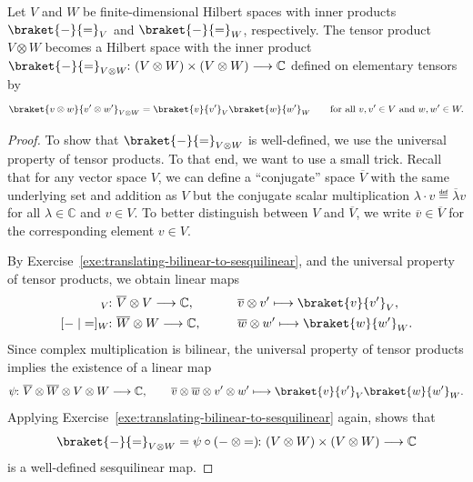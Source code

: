 \documentclass[a4paper, oneside, 12pt]{amsart}
\begin{document}
\begin{proposition}\label{prop:unitary-on-tensor-product}
  Let \( V \) and \( W \) be finite-dimensional Hilbert spaces with inner products \( \braket{\blank}{\bblank}_V \) and \( \braket{\blank}{\bblank}_W \), respectively.
  The tensor product \( V \otimes W \) becomes a Hilbert space with the inner product \(\braket{\blank}{\bblank}_{V \otimes W} \from (V \otimes W) \times (V \otimes W) \to \mathbb{C}\) defined on elementary tensors by
  \begin{equation}
    \braket{v \otimes w}{v' \otimes w'}_{V \otimes W} = \braket{v}{v'}_V \braket{w}{w'}_W \qquad \text{for all } v, v' \in V \text{ and }w, w' \in W.
  \end{equation}
\end{proposition}
\begin{proof}
  To show that \( \braket{\blank}{\bblank}_{V \otimes W} \) is well-defined, we use the universal property of tensor products.
  To that end, we want to use a small trick.
  Recall that for any vector space \(V\), we can define a ``conjugate'' space \(\overline{V}\) with the same underlying set and addition as \(V\) but the conjugate scalar multiplication \(\lambda \cdot v \eqdef \overline{\lambda}v\) for all \(\lambda \in \mathbb{C}\)  and \(v \in V\).
  To better distinguish between \(V\) and \(\overline{V}\), we write \(\overline{v} \in \overline{V}\) for the corresponding element \(v\in V\).

  By Exercise~\ref{exe:translating-bilinear-to-sesquilinear},
  and the universal property of tensor products, we obtain linear maps
  \begin{align*}
    [ \blank \mid \bblank]_{V} &\from \overline{V}\otimes V \to \mathbb{C}, \qquad &&\overline{v} \otimes v' \mapsto \braket{v}{v'}_{V},\\
    [ \blank \mid \bblank]_{W} &\from \overline{W}\otimes W \to \mathbb{C}, \qquad &&\overline{w} \otimes w' \mapsto \braket{w}{w'}_{W}.
  \end{align*}
  Since complex multiplication is bilinear, the universal property of tensor products implies the existence of a linear map
  \begin{equation*}
    \psi \from \overline{V} \otimes \overline{W} \otimes V \otimes W \to \mathbb{C},\qquad
    \overline{v} \otimes \overline{w} \otimes v' \otimes w' \mapsto \braket{v}{v'}_{V}\braket{w}{w'}_{W}.
  \end{equation*}
  Applying Exercise~\ref{exe:translating-bilinear-to-sesquilinear} again, shows that
  \begin{equation*}
    \braket{\blank}{\bblank}_{V \otimes W} =  \psi \circ ( \blank \otimes \bblank) \from (V \otimes W) \times (V \otimes W) \to \mathbb{C}
  \end{equation*}
  is a well-defined sesquilinear map.


\end{proof}
\end{document}
